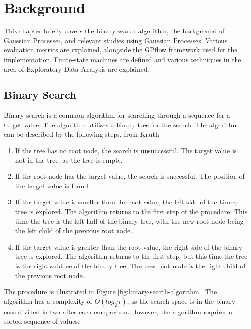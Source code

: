 \chapter{Background}
\label{cha:background}

This chapter briefly covers the binary search algorithm, the background of Gaussian Processes, and relevant studies using Gaussian Processes. 
Various evaluation metrics are explained, alongside the GPflow framework used for the implementation.
Finite-state machines are defined and various techniques in the area of Exploratory Data Analysis are explained. 

\section{Binary Search}
Binary search is a common algorithm for searching through a sequence for a target value.
The algorithm utilises a binary tree for the search.
The algorithm can be described by the following steps, from Knuth \cite{Knuth1971}:
\begin{enumerate}
    \item If the tree has no root node, the search is unsuccessful. 
    The target value is not in the tree, as the tree is empty.
    \item If the root node has the target value, the search is successful.
    The position of the target value is found.
    \item If the target value is smaller than the root value, the left side of the binary tree is explored.
    The algorithm returns to the first step of the procedure.
    This time the tree is the left half of the binary tree, with the new root node being the left child of the previous root node.
    \item If the target value is greater than the root value, the right side of the binary tree is explored.
    The algorithm returns to the first step, but this time the tree is the right subtree of the binary tree.
    The new root node is the right child of the previous root node.
\end{enumerate}
The procedure is illustrated in Figure \ref{fig:binary-search-algorithm}.
The algorithm has a complexity of $O(log_2 n)$, as the search space is in the binary case divided in two after each comparison.
However, the algorithm requires a sorted sequence of values.


